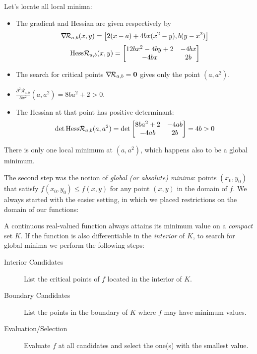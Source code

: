 \begin{example}
Let's locate all local minima:
\begin{itemize}
	\item The gradient and Hessian are given respectively by
	\begin{equation*}
	\mathop{\nabla\! {\mathcal{R}_{a,b}}}(x,y) = \big[ 2(x-a) +4bx(x^2-y) , b(y-x^2) \big] \\
	\end{equation*}
	\begin{equation*}
	\mathop{\mathrm{Hess}{\mathcal{R}_{a,b}}}(x,y) = \begin{bmatrix}
	12bx^2-4by+2 & -4bx \\
	-4bx & 2b
	\end{bmatrix}
	\end{equation*}
	\item The search for critical points $\mathop{\nabla\! {\mathcal{R}_{a,b}}} = \boldsymbol{0}$ gives only the point $(a,a^2)$.
	\item $\frac{\partial^2 \mathcal{R}_{a,b}}{\partial x^2}(a,a^2) = 8ba^2+2 > 0$.
	\item The Hessian at that point has positive determinant:
	\begin{equation*}
	\det \mathop{\mathrm{Hess}{\mathcal{R}_{a,b}}}(a,a^2) = \det \begin{bmatrix}
	8ba^2+2 & -4ab \\
	-4ab & 2b
	\end{bmatrix} = 4b > 0
	\end{equation*}
\end{itemize}
There is only one local minimum at $(a,a^2)$, which happens also to be a global minimum.
\end{example}

The second step was the notion of \emph{global (or absolute) minima}: points $(x_0,y_0)$ that satisfy $f(x_0,y_0) \leq f(x,y)$ for any point $(x,y)$ in the domain of $f$.  We always started with the easier setting, in which we placed restrictions on the domain of our functions:

\begin{theorem}\label{theorem:MaxMinCompact}
A continuous real-valued function always attains its minimum value on a \emph{compact} set $K$. If the function is also differentiable in the \emph{interior} of $K$, to search for global minima we perform the following steps:
\begin{description}
	\item[Interior Candidates] List the critical points of $f$ located in the interior of $K$.
	\item[Boundary Candidates] List the points in the boundary of $K$ where $f$ may have minimum values.
	\item [Evaluation/Selection] Evaluate $f$ at all candidates and select the one(s) with the smallest value.
\end{description}
\end{theorem}

